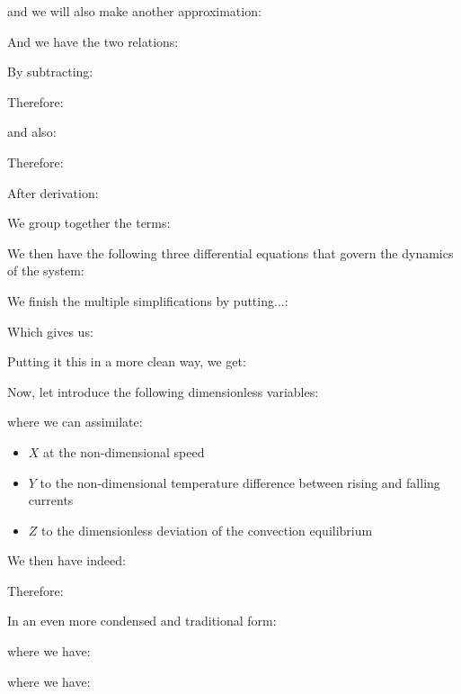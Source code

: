 	and we will also make another approximation:
	
	And we have the two relations:
	
	By subtracting:
	
	Therefore:
	
	and also:
	
	Therefore:
	
	After derivation:
	
	We group together the terms:
	
	We then have the following three differential equations that govern the dynamics of the system:
	
	We finish the multiple simplifications by putting...:
	
	Which gives us:
	
	Putting it this in a more clean way, we get:
	
	Now, let introduce the following dimensionless variables:
	
	where we can assimilate:
	\begin{itemize}
		\item $X$ at the non-dimensional speed

		\item $Y$ to the non-dimensional temperature difference between rising and falling currents

		\item $Z$ to the dimensionless deviation of the convection equilibrium
	\end{itemize}
	We then have indeed:
	
	Therefore:
	
	In an even more condensed and traditional form:
	
	where we have:
	
	where we have:
	
